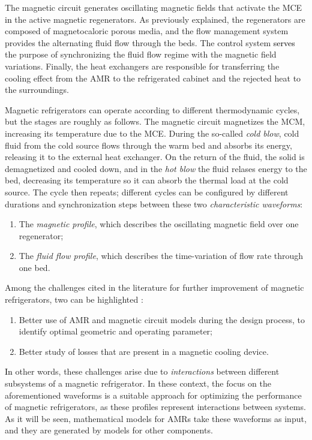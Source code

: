 \documentclass[draft]{svjour3}
\begin{document}
The magnetic circuit generates oscillating magnetic fields that activate the MCE \textcolor{black}{in} the active magnetic regenerators. As previously explained, the regenerators are composed of magnetocaloric porous media, and the flow management system provides the alternating fluid flow through the beds. The control system \textcolor{black}{serves} the purpose of synchronizing the fluid flow regime with the magnetic field variations. Finally, the heat exchangers are responsible for transferring the cooling effect from the AMR to the refrigerated cabinet and the rejected heat to the surroundings. 

Magnetic refrigerators can operate according to different thermodynamic cycles, but the stages are roughly as follows. The magnetic circuit magnetizes the MCM, increasing its temperature due to the MCE. During the so-called \emph{cold blow}, cold fluid from the cold source flows through the warm bed and absorbs its energy, releasing it to the external heat exchanger. On the return of the fluid, the solid is demagnetized and cooled down, and in the \emph{hot blow} the fluid relases energy to the bed, decreasing its temperature so it can absorb the thermal load at the cold source. The cycle then repeats; different cycles can be configured by different durations and synchronization steps between these two \emph{characteristic waveforms}:

\begin{enumerate}
\item The \emph{magnetic profile}, which describes the oscillating magnetic field over one regenerator;
\item The \emph{fluid flow profile}, which describes the time-variation of flow rate through one bed.
\end{enumerate}

Among the challenges cited in the literature for further improvement of magnetic refrigerators, two can be highlighted \cite{bib:eriksen16_activ}:

\begin{enumerate}
\item Better use of AMR and magnetic circuit models during the design process, to identify optimal geometric and operating parameter;
\item Better study of losses that are present in a magnetic cooling device.
\end{enumerate}

\textcolor{black}{In} other words, these challenges arise due to \emph{interactions} between different subsystems \textcolor{black}of a magnetic refrigerator. In these context, the focus on the aforementioned waveforms is a suitable approach for optimizing the performance of magnetic refrigerators, as these profiles represent interactions between systems. As it will be seen, mathematical models for AMRs take these waveforms as input, and they are generated by models for other components.
\end{document}
